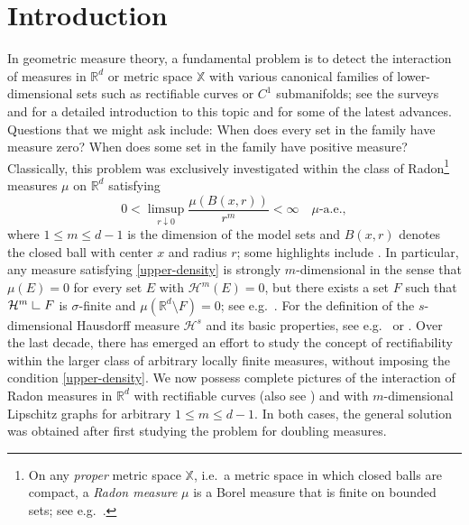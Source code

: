 \documentclass[12pt]{amsart}
\theoremstyle{definition}
\theoremstyle{remark}
\newcommand{\RR}{\mathbb{R}}
\newcommand{\XX}{\mathbb{X}}
\newcommand{\Haus}{\mathcal{H}}
\newcommand{\res}{\hbox{ {\vrule height .22cm}{\leaders\hrule\hskip.2cm} }} %
\numberwithin{figure}{section}
\numberwithin{equation}{section}
\begin{document}
\maketitle

\setcounter{tocdepth}{1}
\tableofcontents

\section{Introduction}\label{s:intro}

In geometric measure theory, a fundamental problem is to detect the interaction of measures in $\RR^d$ or metric space $\XX$ with various canonical families of lower-dimensional sets such as rectifiable curves or $C^1$ submanifolds; see the surveys \cite{ident} and \cite{rectifiability-survey} for a detailed introduction to this topic and \cite{AM-JFA,Bate-tangents,BHS, KL-higher-co-dim-UR} for some of the latest advances. Questions that we might ask include: When does every set in the family have measure zero? When does some set in the family have positive measure? Classically, this problem was exclusively investigated within the class of Radon\footnote{On any \emph{proper} metric space $\XX$, i.e.~a metric space in which closed balls are compact, a \emph{Radon measure} $\mu$ is a Borel measure that is finite on bounded sets; see e.g.~\cite[Chapter 7]{Folland}.} measures $\mu$ on $\RR^d$ satisfying \begin{equation}\label{upper-density} 0<\limsup_{r\downarrow 0} \frac{\mu(B(x,r))}{r^m} <\infty\quad\text{$\mu$-a.e.},\end{equation} where $1\leq m\leq d-1$ is the dimension of the model sets and $B(x,r)$ denotes the closed ball with center $x$ and radius $r$; some highlights include \cite{MR44,Fed47,Preiss}. In particular, any measure satisfying \eqref{upper-density} is strongly $m$-dimensional in the sense that $\mu(E)=0$ for every set $E$ with $\Haus^m(E)=0$, but there exists a set $F$ such that $\Haus^m\res F$ is $\sigma$-finite and $\mu(\RR^d\setminus F)=0$; see e.g.~\cite[\S2.2]{BLZ}. For the definition of the $s$-dimensional Hausdorff measure $\Haus^s$ and its basic properties, see e.g.~\cite{Rogers} or \cite{Mattila}. Over the last decade, there has emerged an effort to study the concept of rectifiability within the larger class of arbitrary locally finite measures, without imposing the condition \eqref{upper-density}. We now possess complete pictures of the interaction of Radon measures in $\RR^d$ with rectifiable curves \cite{BS3} (also see \cite{Lerman,GKS,BS1,AM-rectifiable,BS2,MO-curves,BLZ}) and with $m$-dimensional Lipschitz graphs \cite{Badger-Naples,Dabrowski-cones} for arbitrary $1\leq m\leq d-1$. In both cases, the general solution was obtained after first studying the problem for doubling measures.
\end{document}
